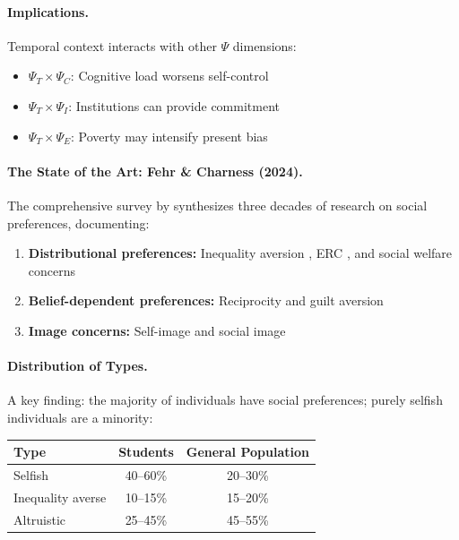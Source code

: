 \paragraph{Implications.}
Temporal context interacts with other $\Psi$ dimensions:
\begin{itemize}
  \item $\Psi_T \times \Psi_C$: Cognitive load worsens self-control
  \item $\Psi_T \times \Psi_I$: Institutions can provide commitment
  \item $\Psi_T \times \Psi_E$: Poverty may intensify present bias
\end{itemize}


\paragraph{The State of the Art: Fehr \& Charness (2024).}
The comprehensive survey by \citet{fehrcharness2024} synthesizes three decades of
research on social preferences, documenting:
\begin{enumerate}
  \item \textbf{Distributional preferences:} Inequality aversion \citep{fehrschmidt1999},
        ERC \citep{boltonockenfels2000}, and social welfare concerns \citep{charnessrabin2002}
  \item \textbf{Belief-dependent preferences:} Reciprocity \citep{rabin1993} and
        guilt aversion \citep{charnessdufwenberg2006}
  \item \textbf{Image concerns:} Self-image and social image \citep{benaboutirole2006}
\end{enumerate}

\paragraph{Distribution of Types.}
A key finding: the majority of individuals have social preferences;
purely selfish individuals are a minority:
\begin{center}
\begin{tabular}{lcc}
\toprule
\textbf{Type} & \textbf{Students} & \textbf{General Population} \\
\midrule
Selfish & 40--60\% & 20--30\% \\
Inequality averse & 10--15\% & 15--20\% \\
Altruistic & 25--45\% & 45--55\% \\
\bottomrule
\end{tabular}
\end{center}

